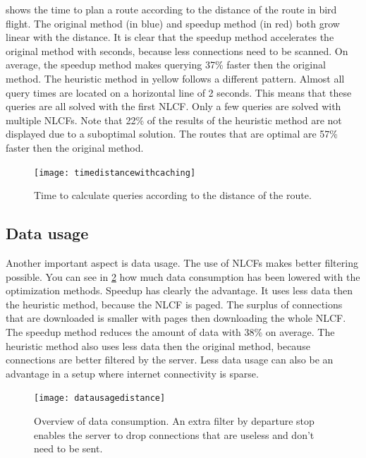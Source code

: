 \documentclass[twocolumn]{phdsymp} %
\begin{document}
 shows the time to plan a route according to the distance of the route in bird flight. The original method (in blue) and speedup method (in red) both grow linear with the distance. It is clear that the speedup method accelerates the original method with seconds, because less connections need to be scanned. On average, the speedup method makes querying 37\% faster then the original method.
The heuristic method in yellow follows a different pattern. Almost all query times are located on a horizontal line of 2 seconds. This means that these queries are all solved with the first NLCF. Only a few queries are solved with multiple NLCFs. Note that 22\% of the results of the heuristic method are not displayed due to a suboptimal solution. The routes that are optimal are 57\% faster then the original method.
\begin{figure}[ht]
\begin{center}
	\texttt{[image: timedistancewithcaching]}
	\caption{\label{timedistancewithcaching}Time to calculate queries according to the distance of the route.}
\end{center}
\end{figure}

\subsection{Data usage}

Another important aspect is data usage. The use of NLCFs makes better filtering possible. You can see in \cref{datausagedistance} how much data consumption has been lowered with the optimization methods. Speedup has clearly the advantage. It uses less data then the heuristic method, because the NLCF is paged. The surplus of connections that are downloaded is smaller with pages then downloading the whole NLCF. The speedup method reduces the amount of data with 38\% on average.
The heuristic method also uses less data then the original method, because connections are better filtered by the server.
Less data usage can also be an advantage in a setup where internet connectivity is sparse.

\begin{figure}[ht]
\begin{center}
	\texttt{[image: datausagedistance]}
	\caption{\label{datausagedistance}Overview of data consumption. An extra filter by departure stop enables the server to drop connections that are useless and don't need to be sent.}
\end{center}
\end{figure}
\end{document}
